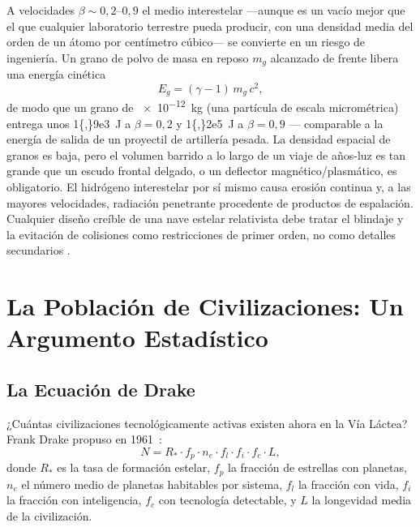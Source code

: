 \documentclass[12pt,a4paper]{article}
\begin{document}
A velocidades $\beta \sim 0{,}2$--$0{,}9$ el medio interestelar ---aunque es un
vacío mejor que el que cualquier laboratorio terrestre pueda producir, con una
densidad media del orden de un átomo por centímetro cúbico--- se convierte en
un riesgo de ingeniería. Un grano de polvo de masa en reposo $m_g$ alcanzado de
frente libera una energía cinética
\begin{equation}
  E_g = (\gamma - 1)\,m_g\,c^2,
  \label{eq:dust_impact_es}
\end{equation}
de modo que un grano de \SI{e-12}{\kilo\gram} (una partícula de escala
micrométrica) entrega unos \SI{1{,}9e3}{\joule} a $\beta = 0{,}2$ y
\SI{1{,}2e5}{\joule} a $\beta = 0{,}9$ --- comparable a la energía de salida de
un proyectil de artillería pesada. La densidad espacial de granos es baja, pero
el volumen barrido a lo largo de un viaje de años-luz es tan grande que un
escudo frontal delgado, o un deflector magnético/plasmático, es obligatorio. El
hidrógeno interestelar por sí mismo causa erosión continua y, a las mayores
velocidades, radiación penetrante procedente de productos de espalación.
Cualquier diseño creíble de una nave estelar relativista debe tratar el
blindaje y la evitación de colisiones como restricciones de primer orden, no
como detalles secundarios \citep{Dyson1968}.

\section{La Población de Civilizaciones: Un Argumento Estadístico}
\label{sec:civilizations_es}

\subsection{La Ecuación de Drake}

¿Cuántas civilizaciones tecnológicamente activas existen ahora en la Vía
Láctea? Frank Drake propuso en 1961~\citep{Drake1961}:
\begin{equation}
  \boxed{N = R_* \cdot f_p \cdot n_e \cdot f_l \cdot f_i \cdot f_c \cdot L,}
\end{equation}
donde $R_*$ es la tasa de formación estelar, $f_p$ la fracción de estrellas
con planetas, $n_e$ el número medio de planetas habitables por sistema, $f_l$
la fracción con vida, $f_i$ la fracción con inteligencia, $f_c$ con tecnología
detectable, y $L$ la longevidad media de la civilización.
\end{document}
